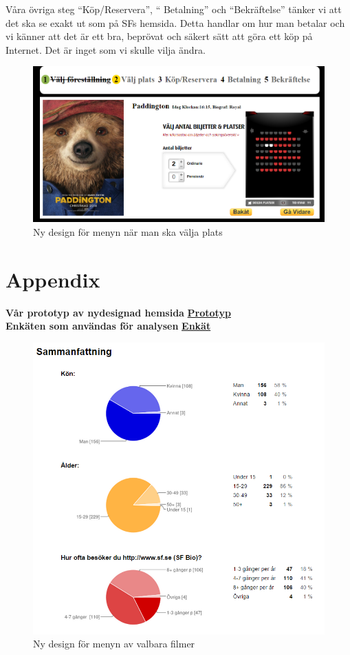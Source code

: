 \documentclass[swedish,a4paper,11pt]{article}
\begin{document}
Våra övriga steg “Köp/Reservera”, “ Betalning” och “Bekräftelse” tänker vi att det ska se exakt ut som på SFs hemsida. Detta handlar om hur man betalar och vi känner att det är ett bra, beprövat och säkert sätt att göra ett köp på Internet. Det är inget som vi skulle vilja ändra.
\begin{figure}[H]
\centering
\includegraphics[scale=0.27]{valdplats.png} 
\caption{Ny design för menyn när man ska välja plats}
\end{figure}


\newpage
\section{Appendix}

\textbf{Vår prototyp av nydesignad hemsida} \hfill \textbf{\href{http://user.it.uu.se/~mise2899/home.html}{Prototyp}}\\
\textbf{Enkäten som användas för analysen} \hfill \textbf{\href{https://docs.google.com/forms/d/1KFDziZeg0wwAXTIV-LeV9eBy-Oa-SH1aR7GebkXLKKI/viewform?c=0&w=1}{Enkät}}

\begin{figure}[H]
\centering
\includegraphics[scale=0.8]{shart1.PNG} 
\caption{Ny design för menyn av valbara filmer}
\end{figure}
\end{document}
